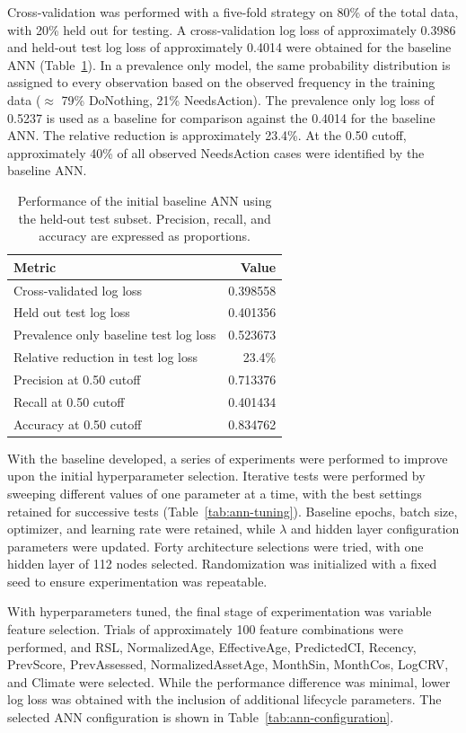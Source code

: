 \documentclass[NewProceedings,letterpaper,NoPageNumbers,NoLineNumbers, DoubleSpace]{ascelike-new}
\begin{document}
Cross-validation was performed with a five-fold strategy on 80\% of the total data, with 20\% held out for testing. A cross-validation log loss of approximately 0.3986 and held-out test log loss of approximately 0.4014 were obtained for the baseline ANN (Table~\ref{tab:ann-baseline-performance}). In a prevalence only model, the same probability distribution is assigned to every observation based on the observed frequency in the training data ($\approx$ 79\% DoNothing, 21\% NeedsAction). The prevalence only log loss of 0.5237 is used as a baseline for comparison against the 0.4014 for the baseline ANN. The relative reduction is approximately 23.4\%. At the 0.50 cutoff, approximately 40\% of all observed NeedsAction cases were identified by the baseline ANN.

\begin{table}[htbp]
\centering
\caption{Performance of the initial baseline ANN using the held-out test subset. Precision, recall, and accuracy are expressed as proportions.}
\label{tab:ann-baseline-performance}
\begin{tabular}{lr}
\hline
\textbf{Metric} & \textbf{Value} \\
\hline
Cross-validated log loss & 0.398558 \\
Held out test log loss & 0.401356 \\
Prevalence only baseline test log loss & 0.523673 \\
Relative reduction in test log loss & 23.4\% \\
Precision at 0.50 cutoff & 0.713376 \\
Recall at 0.50 cutoff & 0.401434 \\
Accuracy at 0.50 cutoff & 0.834762 \\
\hline
\end{tabular}
\end{table}

With the baseline developed, a series of experiments were performed to improve upon the initial hyperparameter selection. Iterative tests were performed by sweeping different values of one parameter at a time, with the best settings retained for successive tests (Table~\ref{tab:ann-tuning}). Baseline epochs, batch size, optimizer, and learning rate were retained, while $\lambda$ and hidden layer configuration parameters were updated. Forty architecture selections were tried, with one hidden layer of 112 nodes selected. Randomization was initialized with a fixed seed to ensure experimentation was repeatable.

With hyperparameters tuned, the final stage of experimentation was variable feature selection. Trials of approximately 100 feature combinations were performed, and RSL, NormalizedAge, EffectiveAge, PredictedCI, Recency, PrevScore, PrevAssessed, NormalizedAssetAge, MonthSin, MonthCos, LogCRV, and Climate were selected. While the performance difference was minimal, lower log loss was obtained with the inclusion of additional lifecycle parameters. The selected ANN configuration is shown in Table~\ref{tab:ann-configuration}.
\end{document}
